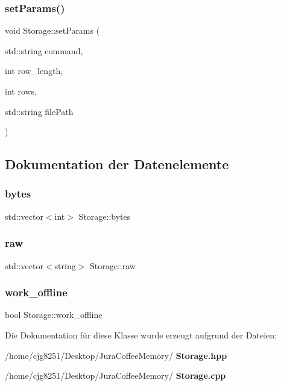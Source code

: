\mbox{\label{class_storage_a061f74b18be706398d7d8070d234ad90}} 
\subsubsection{set\+Params()}
{\footnotesize\ttfamily void Storage\+::set\+Params (\begin{DoxyParamCaption}\item[{std\+::string}]{command,  }\item[{int}]{row\+\_\+length,  }\item[{int}]{rows,  }\item[{std\+::string}]{file\+Path }\end{DoxyParamCaption})}



\subsection{Dokumentation der Datenelemente}
\mbox{\label{class_storage_a5682d2e69bffe775bcda83a54759de0d}} 
\subsubsection{bytes}
{\footnotesize\ttfamily std\+::vector$<$int$>$ Storage\+::bytes}

\mbox{\label{class_storage_a5c26b6c4b245e3deb8ef3a0da04e6f7b}} 
\subsubsection{raw}
{\footnotesize\ttfamily std\+::vector$<$string$>$ Storage\+::raw}

\mbox{\label{class_storage_a76e6060150c2226088365af77fe90385}} 
\subsubsection{work\+\_\+offline}
{\footnotesize\ttfamily bool Storage\+::work\+\_\+offline}



Die Dokumentation für diese Klasse wurde erzeugt aufgrund der Dateien\+:\begin{DoxyCompactItemize}
\item 
/home/cjg8251/\+Desktop/\+Jura\+Coffee\+Memory/\textbf{ Storage.\+hpp}\item 
/home/cjg8251/\+Desktop/\+Jura\+Coffee\+Memory/\textbf{ Storage.\+cpp}\end{DoxyCompactItemize}

